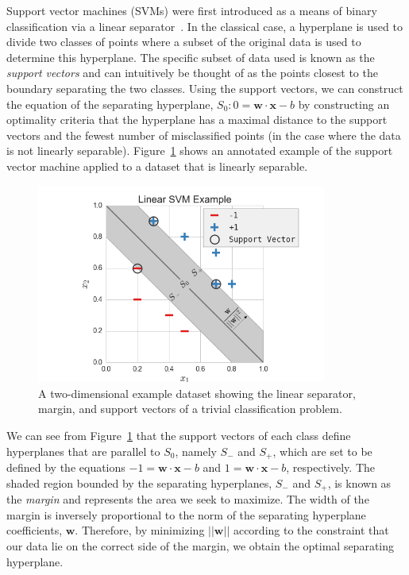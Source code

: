 Support vector machines (SVMs) were first introduced as a means of binary classification via a linear separator~\cite{VapnikLerner1963}.
%
In the classical case, a hyperplane is used to divide two classes of points where a subset of the original data is used to determine this hyperplane.
%
The specific subset of data used is known as the \emph{support vectors} and can intuitively be thought of as the points closest to the boundary separating the two classes.
%
Using the support vectors, we can construct the equation of the separating hyperplane, $S_0: 0 = \mathbf{w} \cdot \mathbf{x} - b$ by constructing an optimality criteria that the hyperplane has a maximal distance to the support vectors and the fewest number of misclassified points (in the case where the data is not linearly separable).
%
Figure~\ref{fig:svmExample} shows an annotated example of the support vector machine applied to a dataset that is linearly separable.

\begin{figure}[b]
  \centering
  \includegraphics[width=0.85\textwidth]{figs/chap3/svmExample}
  \caption[Linear Support Vector Machine Example]{A two-dimensional example dataset showing the linear separator, margin, and support vectors of a trivial classification problem.}
  \label{fig:svmExample}
\end{figure}

We can see from Figure~\ref{fig:svmExample} that the support vectors of each class define hyperplanes that are parallel to $S_0$, namely $S_{-}$ and $S_{+}$, which are set to be defined by the equations $-1 = \mathbf{w} \cdot \mathbf{x} - b$ and $1 = \mathbf{w} \cdot \mathbf{x} - b$, respectively.
%
The shaded region bounded by the separating hyperplanes, $S_{-}$ and $S_{+}$, is known as the \emph{margin} and represents the area we seek to maximize.
%
The width of the margin is inversely proportional to the norm of the separating hyperplane coefficients, $\mathbf{w}$.
%
Therefore, by minimizing $||\mathbf{w}||$ according to the constraint that our data lie on the correct side of the margin, we obtain the optimal separating hyperplane.

